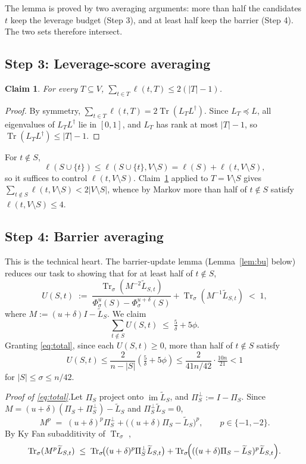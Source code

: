 \documentclass[11pt]{article}
\newcommand{\Tr}{\operatorname{Tr}}
\newcommand{\Trs}{\operatorname{Tr}_{\sigma}}
\newcommand{\del}{\delta}
\DeclareMathOperator{\im}{im}
\newcommand{\tL}{\widetilde{L}}
\newcommand{\Lt}{L^{\dagger}}
\newtheorem{claim}[theorem]{Claim}
\begin{document}
\noindent The lemma is proved by two averaging arguments: more than half the
candidates $t$ keep the leverage budget (Step 3), and at least half keep the
barrier (Step 4). The two sets therefore intersect.

\subsection*{Step 3: Leverage-score averaging}

\begin{claim}\label{cl:Tlev}
For every $T\subseteq V$, $\sum_{t\in T}\ell(t,T)\le 2(|T|-1)$.
\end{claim}
\begin{proof}
By symmetry, $\sum_{t\in T}\ell(t,T)=2\Tr(L_T\Lt)$. Since $L_T\preceq L$, all
eigenvalues of $L_T\Lt$ lie in $[0,1]$, and $L_T$ has rank at most $|T|-1$, so
$\Tr(L_T\Lt)\le|T|-1$.
\end{proof}

For $t\notin S$,
\[
  \ell(S\cup\{t\}) \le \ell(S\cup\{t\},V\setminus S)
                   = \ell(S)+\ell(t,V\setminus S),
\]
so it suffices to control $\ell(t,V\setminus S)$. Claim~\ref{cl:Tlev} applied
to $T=V\setminus S$ gives
$\sum_{t\notin S}\ell(t,V\setminus S)<2|V\setminus S|$, whence by Markov more
than half of $t\notin S$ satisfy $\ell(t,V\setminus S)\le 4$.

\subsection*{Step 4: Barrier averaging}

This is the technical heart. The barrier-update lemma (Lemma~\ref{lem:bu}
below) reduces our task to showing that for at least half of $t\notin S$,
\begin{equation}\label{eq:U}
  U(S,t) \;:=\;
  \frac{\Trs(M^{-2}\tL_{S,t})}{\Phi^u_\sigma(S)-\Phi^{u+\del}_\sigma(S)}
   + \Trs(M^{-1}\tL_{S,t}) \;<\; 1,
\end{equation}
where $M:=(u+\del)I-\tL_S$. We claim
\begin{equation}\label{eq:total}
  \sum_{t\notin S} U(S,t) \;\le\; \tfrac{5}{\del} + 5\phi.
\end{equation}
Granting \eqref{eq:total}, since each $U(S,t)\ge 0$, more than half of
$t\notin S$ satisfy
\[
  U(S,t)\le\frac{2}{n-|S|}\!\left(\tfrac{5}{\del}+5\phi\right)
        \le \frac{2}{41n/42}\cdot\tfrac{10n}{21} < 1
\]
for $|S|\le\sigma\le n/42$.

\medskip
\noindent\emph{Proof of \eqref{eq:total}.}\quad Let $\Pi_S$ project onto
$\im\tL_S$, and $\Pi_S^\perp:=I-\Pi_S$. Since
$M=(u+\del)(\Pi_S+\Pi_S^\perp)-\tL_S$ and $\Pi_S^\perp\tL_S=0$,
\[
  M^p \;=\; (u+\del)^p\Pi_S^\perp + \bigl((u+\del)\Pi_S-\tL_S\bigr)^p,
  \qquad p\in\{-1,-2\}.
\]
By Ky Fan subadditivity of $\Trs$ \cite[Thm.~4.3.47a]{HJ12},
\begin{equation}\label{eq:split}
  \Trs(M^p\tL_{S,t}) \;\le\;
  \Trs\!\bigl((u+\del)^p\Pi_S^\perp\tL_{S,t}\bigr)
  + \Trs\!\Bigl(((u+\del)\Pi_S-\tL_S)^p\tL_{S,t}\Bigr).
\end{equation}
\end{document}
